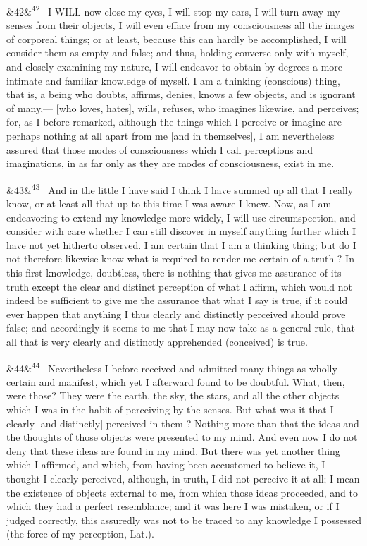 \documentclass[12pt]{article}
\newcommand{\para}[1][]{\par\noindent\ifx&#1&\else\textsuperscript{\footnotesize #1}~\fi}
\begin{document}
\para[42] I WILL now close my eyes, I will stop my ears, I will turn away my senses from their objects, I will even efface from my consciousness all the images of corporeal things; or at least, because this can hardly be accomplished, I will consider them as empty and false; and thus, holding converse only with myself, and closely examining my nature, I will endeavor to obtain by degrees a more intimate and familiar knowledge of myself. I am a thinking (conscious) thing, that is, a being who doubts, affirms, denies, knows a few objects, and is ignorant of many,--- [who loves, hates], wills, refuses, who imagines likewise, and perceives; for, as I before remarked, although the things which I perceive or imagine are perhaps nothing at all apart from me [and in themselves], I am nevertheless assured that those modes of consciousness which I call perceptions and imaginations, in as far only as they are modes of consciousness, exist in me.

\para[43] And in the little I have said I think I have summed up all that I really know, or at least all that up to this time I was aware I knew. Now, as I am endeavoring to extend my knowledge more widely, I will use circumspection, and consider with care whether I can still discover in myself anything further which I have not yet hitherto observed. I am certain that I am a thinking thing; but do I not therefore likewise know what is required to render me certain of a truth ? In this first knowledge, doubtless, there is nothing that gives me assurance of its truth except the clear and distinct perception of what I affirm, which would not indeed be sufficient to give me the assurance that what I say is true, if it could ever happen that anything I thus clearly and distinctly perceived should prove false; and accordingly it seems to me that I may now take as a general rule, that all that is very clearly and distinctly apprehended (conceived) is true.

\para[44] Nevertheless I before received and admitted many things as wholly certain and manifest, which yet I afterward found to be doubtful. What, then, were those? They were the earth, the sky, the stars, and all the other objects which I was in the habit of perceiving by the senses. But what was it that I clearly [and distinctly] perceived in them ? Nothing more than that the ideas and the thoughts of those objects were presented to my mind. And even now I do not deny that these ideas are found in my mind. But there was yet another thing which I affirmed, and which, from having been accustomed to believe it, I thought I clearly perceived, although, in truth, I did not perceive it at all; I mean the existence of objects external to me, from which those ideas proceeded, and to which they had a perfect resemblance; and it was here I was mistaken, or if I judged correctly, this assuredly was not to be traced to any knowledge I possessed (the force of my perception, Lat.).
\end{document}
